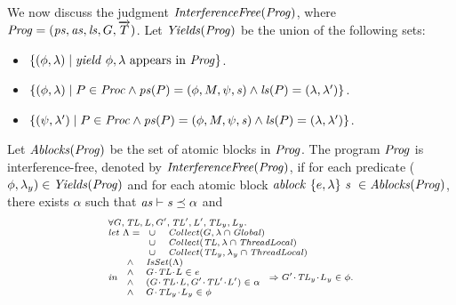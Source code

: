 We now discuss the judgment $\mathit{InterferenceFree}(\mathit{Prog})$,
where $\mathit{Prog} = (\mathit{ps}, \mathit{as}, \mathit{ls}, G, \overrightarrow{T})$. 
Let $\mathit{Yields}(\mathit{Prog})$ be the union of the following sets:
\begin{itemize}
\item
$\{(\phi,\lambda) \mid \mathit{yield}\ \phi,\lambda~\mathrm{appears~in~\mathit{Prog}}\}$.
\item
$\{(\phi,\lambda) \mid P \in \mathit{Proc} \wedge \mathit{ps}(P) = (\phi, M, \psi, \mathit{s}) \wedge \mathit{ls}(P) = (\lambda,\lambda')\}$.
\item
$\{(\psi,\lambda') \mid P \in \mathit{Proc} \wedge \mathit{ps}(P) = (\phi, M, \psi, \mathit{s}) \wedge \mathit{ls}(P) = (\lambda,\lambda')\}$.
\end{itemize}
Let $\mathit{Ablocks}(\mathit{Prog})$ be the set of atomic blocks in $\mathit{Prog}$.
The program $\mathit{Prog}$ is interference-free, denoted by $\mathit{InterferenceFree}(\mathit{Prog})$,
if for each predicate ($\phi,\lambda_y) \in \mathit{Yields}(\mathit{Prog})$ and 
for each atomic block $\mathit{ablock}\ {\{e,\lambda\}}\ {\mathit{s}}\  \in \mathit{Ablocks}(\mathit{Prog})$, there exists $\alpha$ such that 
$\mathit{as} \vdash \mathit{s} \preceq \alpha$ and 
\[
\scriptsize{
\begin{array}{l}
\forall \varsG,\varsTL,\varsL,\varsG',\varsTL',\varsL',\varsTL_y,\varsL_y.\\ 
\mathit{let}\ \Lambda =
\begin{array}[t]{ll}
\cup & \Collect(\varsG, \lins \cap \Global) \\
\cup & \Collect(\varsTL, \lins \cap \ThreadLocal) \\
\cup & \Collect(\varsTL_y, \lins_y \cap \ThreadLocal) 
\end{array} \\
\mathit{in}\
\begin{array}{ll}
\wedge & \IsSet(\Lambda) \\
\wedge & \MakeStore{\varsG}{\varsTL}{\varsL} \in e \\
\wedge & (\MakeStore{\varsG}{\varsTL}{\varsL}, \MakeStore{\varsG'}{\varsTL'}{\varsL'}) \in \alpha \\
\wedge & \MakeStore{\varsG}{\varsTL_y}{\varsL_y} \in \phi
\end{array}
\Rightarrow \MakeStore{\varsG'}{\varsTL_y}{\varsL_y} \in \phi.
\end{array}
}
\]

